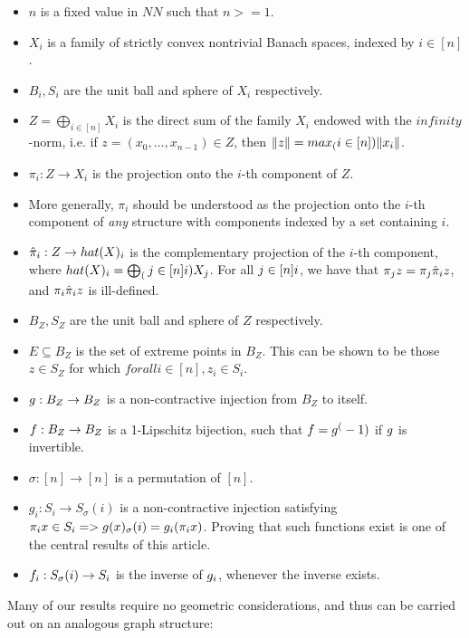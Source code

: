 \documentclass{amsart}
\theoremstyle{definition}
\begin{document}
\begin{itemize}
    \item $n$ is a fixed value in $NN$ such that $n >= 1$.
    \item $X_i$ is a family of strictly convex nontrivial Banach spaces, indexed by $i \in [n]$.
    \item $B_i, S_i$ are the unit ball and sphere of $X_i$ respectively.
    \item $Z = \bigoplus_{i \in [n]} X_i$ is the direct sum of the family $X_i$ endowed with the $infinity$-norm, i.e. if $z = (x_0, \ldots, x_{n-1}) \in Z$, then $\norm{z} = max_(i \in [n]) \norm{x_i}$.
    \item $\pi_i : Z \to X_i$ is the projection onto the $i$-th component of $Z$.
    \item More generally, $\pi_i$ should be understood as the projection onto the $i$-th component of \textit{any} structure with components indexed by a set containing $i$.
    \item $\hat{\pi}_i : Z \to hat(X)_i$ is the complementary projection of the $i$-th component, where $hat(X)_i = \bigoplus_(j \in [n] \\ {i} )X_j$. For all $j \in [n] \\ i$, we have that $\pi_j z = \pi_j \hat{\pi}_i z$, and $\pi_i \hat{\pi}_i z$ is ill-defined.
    \item $B_Z, S_Z$ are the unit ball and sphere of $Z$ respectively.
    \item $E \subseteq B_Z$ is the set of extreme points in $B_Z$. This can be shown to be those $z \in S_Z$ for which $forall i \in [n], z_i \in S_i$.
    \item $g : B_Z \to B_Z$ is a non-contractive injection from $B_Z$ to itself.
    \item $f : B_Z \to B_Z$ is a 1-Lipschitz bijection, such that $f = g^(-1)$ if $g$ is invertible.
    \item $\sigma : [n] \to [n]$ is a permutation of $[n]$.
    \item $g_i : S_i \to S_\sigma(i)$ is a non-contractive injection satisfying $\pi_i x \in S_i => g(x)_\sigma(i) = g_i (\pi_i x)$. Proving that such functions exist is one of the central results of this article.
    \item $f_i : S_\sigma(i) \to S_i$ is the inverse of $g_i$, whenever the inverse exists.
\end{itemize}

Many of our results require no geometric considerations, and thus can be carried out on an analogous graph structure:
\end{document}
